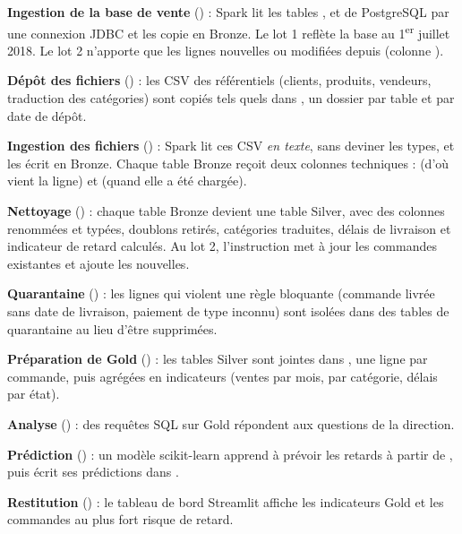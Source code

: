 \begin{description}[leftmargin=1.4em,labelindent=0pt,itemsep=3pt,font=\normalfont]
\item[\etape{1}] \textbf{Ingestion de la base de vente} () : Spark lit les tables
  ,  et  de PostgreSQL par une connexion JDBC et
  les copie en Bronze. Le lot 1 reflète la base au 1\textsuperscript{er} juillet 2018. Le lot 2
  n'apporte que les lignes nouvelles ou modifiées depuis (colonne ).
\item[\etape{2}] \textbf{Dépôt des fichiers} () : les CSV des référentiels (clients, produits, vendeurs,
  traduction des catégories) sont copiés tels quels dans , un dossier par table et
  par date de dépôt.
\item[\etape{3}] \textbf{Ingestion des fichiers} () : Spark lit ces CSV \emph{en texte},
  sans deviner les types, et les écrit en Bronze. Chaque table Bronze reçoit deux colonnes techniques :
   (d'où vient la ligne) et  (quand elle a été chargée).
\item[\etape{4}] \textbf{Nettoyage} () : chaque table Bronze devient une table
  Silver, avec des colonnes renommées et typées, doublons retirés, catégories traduites, délais de livraison et indicateur de retard
  calculés. Au lot 2, l'instruction  met à jour les commandes existantes et ajoute les
  nouvelles.
\item[\etape{5}] \textbf{Quarantaine} () : les lignes qui violent une règle bloquante (commande
  \og livrée \fg{} sans date de livraison, paiement de type inconnu) sont isolées dans des tables de
  quarantaine au lieu d'être supprimées.
\item[\etape{6}] \textbf{Préparation de Gold} () : les tables Silver
  sont jointes dans , une ligne par commande, puis agrégées en indicateurs (ventes
  par mois, par catégorie, délais par état).
\item[\etape{7}] \textbf{Analyse} () : des requêtes SQL sur Gold répondent aux questions de la direction.
\item[\etape{8}] \textbf{Prédiction} () : un modèle scikit-learn apprend à prévoir les retards à partir
  de , puis écrit ses prédictions dans .
\item[\etape{9}] \textbf{Restitution} () : le tableau de bord Streamlit affiche les indicateurs Gold et
  les commandes au plus fort risque de retard.
\end{description}

